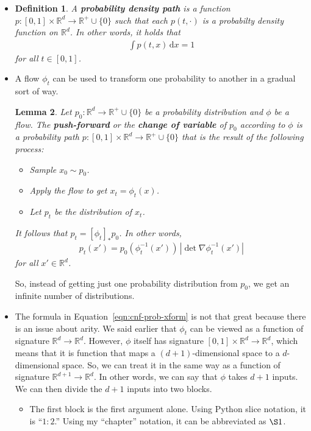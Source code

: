 \documentclass[10pt]{article}
\newtheorem{lemma}{Lemma}
\newtheorem{definition}[lemma]{Definition}
\newcommand{\dee}{\mathrm{d}}
\newcommand{\ra}{\rightarrow}
\newcommand{\Real}{\mathbb{R}}
\begin{document}
\begin{itemize}
  \item \begin{definition} A {\bf probability density path} is a function $p: [0,1] \times \Real^d \rightarrow \Real^{+} \cup \{0\}$ such that each $p(t,\cdot)$ is a probabilty density function on $\Real^d$. In other words, it holds that
    \begin{align*}
      \int p(t,x)\, \dee x = 1
    \end{align*}
    for all $t \in [0,1]$.
    \end{definition}

  \item A flow $\phi_t$ can be used to transform one probability to another in a gradual sort of way.
  \begin{lemma}
    Let $p_0: \Real^d \ra \Real^{+} \cup \{0\}$ be a probability distribution and $\phi$ be a flow. The {\bf push-forward} or the {\bf change of variable} of $p_0$ according to $\phi$ is a probability path $p: [0,1] \times \Real^d \ra \Real^+ \cup \{0\}$ that is the result of the following process:
    \begin{itemize}
      \item Sample $x_0 \sim p_0$.
      \item Apply the flow to get $x_t = \phi_t(x)$.
      \item Let $p_t$ be the distribution of $x_t$.
    \end{itemize}
    It follows that $p_t = [\phi_t]_* p_0$. In other words,
    \begin{align}
      p_t(x') = p_0(\phi_t^{-1}(x'))\, |\det \nabla \phi_t^{-1}(x')| \label{eqn:cnf-prob-xform}
    \end{align}
    for all $x' \in \Real^d$.    
  \end{lemma}
  So, instead of getting just one probability distribution from $p_0$, we get an infinite number of distributions.  

  \item The formula in Equation~\eqref{eqn:cnf-prob-xform} is not that great because there is an issue about arity. We said earlier that $\phi_t$ can be viewed as a function of signature $\Real^d \ra \Real^d$. However, $\phi$ itself has signature $[0,1] \times \Real^{d} \ra \Real^d$, which means that it is function that maps a $(d+1)$-dimensional space to a $d$-dimensional space. So, we can treat it in the same way as a function of signature $\Real^{d+1} \ra \Real^d$. In other words, we can say that $\phi$ takes $d+1$ inputs. We can then divide the $d+1$ inputs into two blocks.
  \begin{itemize}
    \item The first block is the first argument alone. Using Python slice notation, it is ``$1:2$.'' Using my ``chapter'' notation, it can be abbreviated as $\S 1$.
    

\end{itemize}
\end{itemize}
\end{document}
